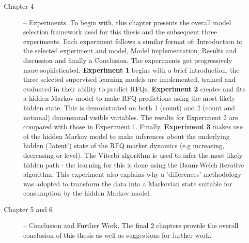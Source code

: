 \begin{description}
\item[Chapter 4] -- Experiments. To begin with, this chapter presents the overall model selection framework used for this thesis and the subsequent three experiments. Each experiment follows a similar format of: Introduction to the selected experiment and model, Model implementation, Results and discussion and finally a Conclusion. The experiments get progressively more sophisticated. \textbf{Experiment 1} begins with a brief introduction, the three selected supervised learning models are implemented, trained and evaluated in their ability to predict RFQs. \textbf{Experiment 2} creates and fits a hidden Markov model to make RFQ predictions using the most likely hidden state. This is demonstrated on both 1 (count) and 2 (count and notional) dimensional visible variables. The results for Experiment 2 are compared with those in Experiment 1. Finally, \textbf{Experiment 3} makes use of the hidden Markov model to make inferences about the underlying hidden ('latent') state of the RFQ market dynamics (e.g increasing, decreasing or level). The Viterbi algorithm is used to infer the most likely hidden path - the learning for this is done using the Baum-Welch iterative algorithm. This experiment also explains why a 'differences' methodology was adopted to transform the data into a Markovian state suitable for consumption by the hidden Markov model.

\item[Chapter 5 and 6] -- Conclusion and Further Work. The final 2 chapters provide the overall conclusion of this thesis as well as suggestions for further work.


\end{description}

